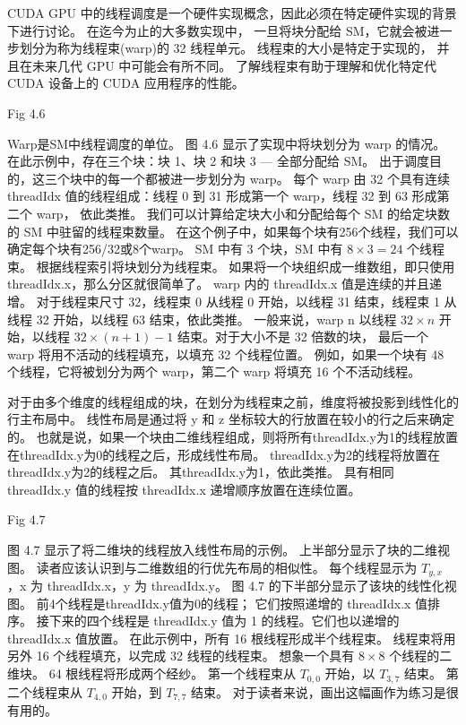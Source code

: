 CUDA GPU 中的线程调度是一个硬件实现概念，因此必须在特定硬件实现的背景下进行讨论。 在迄今为止的大多数实现中，
一旦将块分配给 SM，它就会被进一步划分为称为线程束(warp)的 32 线程单元。 线程束的大小是特定于实现的，
并且在未来几代 GPU 中可能会有所不同。 了解线程束有助于理解和优化特定代 CUDA 设备上的 CUDA 应用程序的性能。

{\color{red} Fig 4.6}

Warp是SM中线程调度的单位。 图 4.6 显示了实现中将块划分为 warp 的情况。 
在此示例中，存在三个块：块 1、块 2 和块 3 — 全部分配给 SM。 出于调度目的，这三个块中的每一个都被进一步划分为 warp。 
每个 warp 由 32 个具有连续 threadIdx 值的线程组成：线程 0 到 31 形成第一个 warp，线程 32 到 63 形成第二个 warp，
依此类推。 我们可以计算给定块大小和分配给每个 SM 的给定块数的 SM 中驻留的线程束数量。 
在这个例子中，如果每个块有256个线程，我们可以确定每个块有256/32或8个warp。 
SM 中有 3 个块，SM 中有 $8 \times 3 = 24$ 个线程束。 根据线程索引将块划分为线程束。 
如果将一个块组织成一维数组，即只使用threadIdx.x，那么分区就很简单了。 warp 内的 threadIdx.x 值是连续的并且递增。 
对于线程束尺寸 32，线程束 0 从线程 0 开始，以线程 31 结束，线程束 1 从线程 32 开始，以线程 63 结束，依此类推。 
一般来说，warp n 以线程 $32 \times n$ 开始，以线程 $32 \times (n+1) - 1$ 结束。对于大小不是 32 倍数的块，
最后一个 warp 将用不活动的线程填充，以填充 32 个线程位置。 
例如，如果一个块有 48 个线程，它将被划分为两个 warp，第二个 warp 将填充 16 个不活动线程。

对于由多个维度的线程组成的块，在划分为线程束之前，维度将被投影到线性化的行主布局中。 
线性布局是通过将 y 和 z 坐标较大的行放置在较小的行之后来确定的。 
也就是说，如果一个块由二维线程组成，则将所有threadIdx.y为1的线程放置在threadIdx.y为0的线程之后，形成线性布局。
threadIdx.y为2的线程将放置在threadIdx.y为2的线程之后。 其threadIdx.y为1，依此类推。 
具有相同 threadIdx.y 值的线程按 threadIdx.x 递增顺序放置在连续位置。

{\color{red} Fig 4.7}

图 4.7 显示了将二维块的线程放入线性布局的示例。 上半部分显示了块的二维视图。 
读者应该认识到与二维数组的行优先布局的相似性。 每个线程显示为 $T_{y,x}$ ，x 为 threadIdx.x，y 为 threadIdx.y。 
图 4.7 的下半部分显示了该块的线性化视图。 前4个线程是threadIdx.y值为0的线程； 它们按照递增的 threadIdx.x 值排序。 
接下来的四个线程是 threadIdx.y 值为 1 的线程。它们也以递增的 threadIdx.x 值放置。 
在此示例中，所有 16 根线程形成半个线程束。 线程束将用另外 16 个线程填充，以完成 32 线程的线程束。 
想象一个具有 $8 \times 8$ 个线程的二维块。 64 根线程将形成两个经纱。 
第一个线程束从 $T_{0,0}$ 开始，以 $T_{3,7}$ 结束。 
第二个线程束从 $T_{4,0}$ 开始，到 $T_{7,7}$ 结束。 对于读者来说，画出这幅画作为练习是很有用的。

